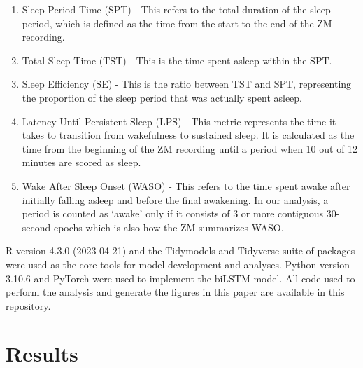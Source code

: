 \documentclass[
  super,
  preprint,
  3p]{elsarticle}
\begin{document}
\begin{enumerate}
\def\labelenumi{\arabic{enumi}.}
\item
  Sleep Period Time (SPT) - This refers to the total duration of the
  sleep period, which is defined as the time from the start to the end
  of the ZM recording.
\item
  Total Sleep Time (TST) - This is the time spent asleep within the SPT.
\item
  Sleep Efficiency (SE) - This is the ratio between TST and SPT,
  representing the proportion of the sleep period that was actually
  spent asleep.
\item
  Latency Until Persistent Sleep (LPS) - This metric represents the time
  it takes to transition from wakefulness to sustained sleep. It is
  calculated as the time from the beginning of the ZM recording until a
  period when 10 out of 12 minutes are scored as sleep.
\item
  Wake After Sleep Onset (WASO) - This refers to the time spent awake
  after initially falling asleep and before the final awakening. In our
  analysis, a period is counted as `awake' only if it consists of 3 or
  more contiguous 30-second epochs which is also how the ZM summarizes
  WASO.
\end{enumerate}

R version 4.3.0 (2023-04-21)\citep{R-lang} and the
Tidymodels\citep{tidymodels} and Tidyverse\citep{tidyverse} suite of
packages were used as the core tools for model development and analyses.
Python version 3.10.6\citep{10.5555/1593511} and
PyTorch\citep{NEURIPS2019_9015} were used to implement the biLSTM model.
All code used to perform the analysis and generate the figures in this
paper are available in
\href{https://github.com/esbenlykke/sleep_study}{this repository}.

\hypertarget{results}{%
\section{Results}\label{results}}
\end{document}
